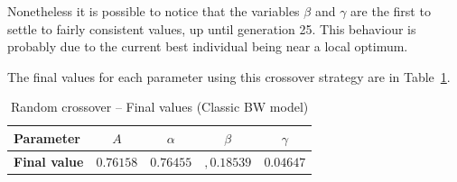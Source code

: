 Nonetheless it is possible to notice that the variables $\beta$ and $\gamma$
are the first to settle to fairly consistent values, up until generation 25.
This behaviour is probably due to the current best individual being near a local optimum.

The final values for each parameter using this crossover strategy
are in Table~\ref{tab:ga_classic_random_final}.

\begin{table}[H]
	\centering
	\begin{tabular}{l c c c c}
		\toprule
		\textbf{Parameter}		& $A$	& $\alpha$	& $\beta$	& $\gamma$ 	\\ \midrule
		\textbf{Final value}	& $0.76158$	& $0.76455$	& $,0.18539$ & $0.04647$	\\ \bottomrule
	\end{tabular}
	\caption{Random crossover -- Final values (Classic BW model)}
	\label{tab:ga_classic_random_final}
\end{table}

